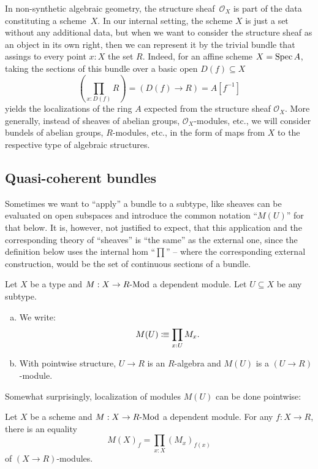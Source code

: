 In non-synthetic algebraic geometry,
the structure sheaf~$\mathcal{O}_X$ is part of the data constituting a scheme~$X$.
In our internal setting,
the scheme $X$ is just a set without any additional data,
but when we want to consider the structure sheaf as an object in its own right,
then we can represent it by the trivial bundle
that assings to every point $x : X$ the set $R$.
Indeed, for an affine scheme $X = \operatorname{Spec} A$,
taking the sections of this bundle over a basic open $D(f) \subseteq X$
\[ (\prod_{x : D(f)} R) = (D(f) \to R) = A[f^{-1}] \]
yields the localizations of the ring $A$
expected from the structure sheaf $\mathcal{O}_X$.
More generally,
instead of sheaves of abelian groups, $\mathcal{O}_X$-modules, etc.,
we will consider bundels of abelian groups, $R$-modules, etc.,
in the form of maps from $X$ to the respective type of algebraic structures.

\subsection{Quasi-coherent bundles}

Sometimes we want to ``apply'' a bundle to a subtype,
like sheaves can be evaluated on open subspaces
and introduce the common notation ``$M(U)$'' for that below.
It is, however, not justified to expect, that this application
and the corresponding theory of ``sheaves'' is ``the same'' as the external one,
since the definition below uses the internal hom ``$\prod$''
-- where the corresponding external construction, would be the set of continuous sections of a bundle.

\begin{definition}
  Let $X$ be a type and $M:X\to R\text{-}\mathrm{Mod}$ a dependent module.
  Let $U\subseteq X$ be any subtype.
  \begin{enumerate}[(a)]
  \item We write:
    \[
      M(U)\colonequiv \prod_{x:U}M_x
      \rlap{.}
    \]
  \item With pointwise structure, $U\to R$ is an $R$-algebra
    and $M(U)$ is a $(U\to R)$-module.
  \end{enumerate}
\end{definition}

Somewhat surprisingly, localization of modules $M(U)$
can be done pointwise:

\begin{lemma}%
  \label{module-bundle-localization-pointwise}
  Let $X$ be a scheme and $M:X\to R\text{-}\mathrm{Mod}$ a dependent module.
  For any $f:X\to R$, there is an equality
  \[
    M(X)_f=\prod_{x:X}(M_x)_{f(x)}
  \]
  of $(X\to R)$-modules.
\end{lemma}

